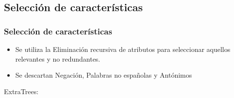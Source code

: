 \subsection{Selección de características}
\begin{frame}[allowframebreaks]
    \frametitle{Selección de características}

    \begin{itemize}
        \item Se utiliza la Eliminación recursiva de atributos para seleccionar aquellos relevantes y no redundantes.
        \item Se descartan Negación, Palabras no españolas y Antónimos
    \end{itemize}

    \framebreak

    ExtraTrees:


\end{frame}
